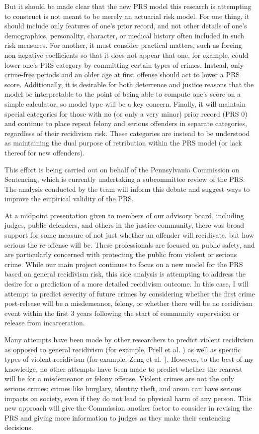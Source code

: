 \documentclass{article}
\begin{document}
But it should be made clear that the new PRS model this research is attempting to construct is not meant to be merely an actuarial risk model. For one thing, it should include only features of one's prior record, and not other details of one's demographics, personality, character, or medical history often included in such risk measures. For another, it must consider practical matters, such as forcing non-negative coefficients so that it does not appear that one, for example, could lower one's PRS category by committing certain types of crimes. Instead, only crime-free periods and an older age at first offense should act to lower a PRS score. Additionally, it is desirable for both deterrence and justice reasons that the model be interpretable to the point of being able to compute one's score on a simple calculator, so model type will be a key concern. Finally, it will maintain special categories for those with no (or only a very minor) prior record (PRS 0) and continue to place repeat felony and serious offenders in separate categories, regardless of their recidivism risk. These categories are instead to be understood as maintaining the dual purpose of retribution within the PRS model (or lack thereof for new offenders).

This effort is being carried out on behalf of the Pennsylvania Commission on Sentencing, which is currently undertaking a subcommittee review of the PRS. The analysis conducted by the team will inform this debate and suggest ways to improve the empirical validity of the PRS. 

At a midpoint presentation given to members of our advisory board, including judges, public defenders, and others in the justice community, there was broad support for some measure of not just whether an offender will recidivate, but how serious the re-offense will be. These professionals are focused on public safety, and are particularly concerned with protecting the public from violent or serious crime. While our main project continues to focus on a new model for the PRS based on general recidivism risk, this side analysis is attempting to address the desire for a prediction of a more detailed recidivism outcome. In this case, I will attempt to predict severity of future crimes by considering whether the first crime post-release will be a misdemeanor, felony, or whether there will be no recidivism event within the first 3 years following the start of community supervision or release from incarceration.

Many attempts have been made by other researchers to predict violent recidivism as opposed to general recidivism (for example, Prell et al. \cite{violence}) as well as specific types of violent recidivism (for example, Zeng et al. \cite{zeng}). However, to the best of my knowledge, no other attempts have been made to predict whether the rearrest will be for a misdemeanor or felony offense. Violent crimes are not the only serious crimes; crimes like burglary, identity theft, and arson can have serious impacts on society, even if they do not lead to physical harm of any person. This new approach will give the Commission another factor to consider in revising the PRS and giving more information to judges as they make their sentencing decisions.
\end{document}

